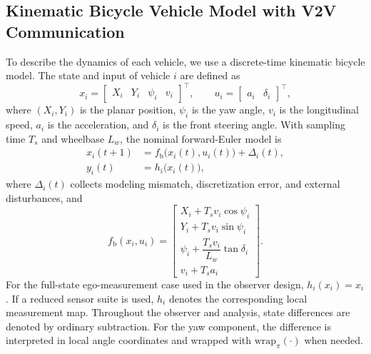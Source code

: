 \documentclass[journal,twoside]{IEEEtran}
\begin{document}
\subsection{Kinematic Bicycle Vehicle Model with V2V Communication}
To describe the dynamics of each vehicle, we use a discrete-time kinematic bicycle model. The state and input of vehicle $i$ are defined as
\begin{equation*}
    x_i=\begin{bmatrix}X_i&Y_i&\psi_i&v_i\end{bmatrix}^{\top},
    \qquad
    u_i=\begin{bmatrix}a_i&\delta_i\end{bmatrix}^{\top},
\end{equation*}
where $(X_i,Y_i)$ is the planar position, $\psi_i$ is the yaw angle, $v_i$ is the longitudinal speed, $a_i$ is the acceleration, and $\delta_i$ is the front steering angle. With sampling time $T_s$ and wheelbase $L_w$, the nominal forward-Euler model is
\begin{equation}\label{v_i}
    \begin{aligned}
        x_i(t+1) &= f_{\text{b}}\big(x_i(t),u_i(t)\big)+\Delta_i(t),\\
        y_i(t) &= h_i\big(x_i(t)\big),
    \end{aligned}
\end{equation}
where $\Delta_i(t)$ collects modeling mismatch, discretization error, and external disturbances, and
\begin{equation}
f_{\text{b}}(x_i,u_i)=
\begin{bmatrix}
X_i+T_s v_i\cos\psi_i\\
Y_i+T_s v_i\sin\psi_i\\
\psi_i+\dfrac{T_s v_i}{L_w}\tan\delta_i\\
v_i+T_s a_i
\end{bmatrix}.
\label{eq_bicycle_map}
\end{equation}
For the full-state ego-measurement case used in the observer design, $h_i(x_i)=x_i$. If a reduced sensor suite is used, $h_i$ denotes the corresponding local measurement map.
Throughout the observer and analysis, state differences are denoted by ordinary subtraction. For the yaw component, the difference is interpreted in local angle coordinates and wrapped with $\mathrm{wrap}_{\pi}(\cdot)$ when needed.
\end{document}
